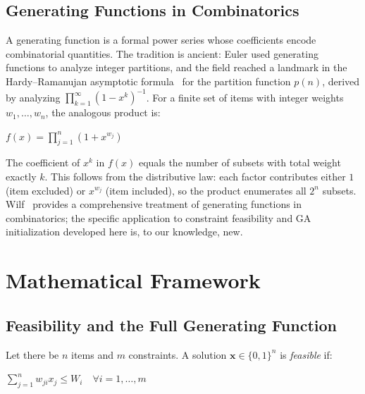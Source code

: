 \documentclass[twocolumn]{article}
\begin{document}
\subsection{Generating Functions in Combinatorics}

A generating function is a formal power series whose coefficients encode 
combinatorial quantities. The tradition is ancient: Euler used generating 
functions to analyze integer partitions, and the field reached a landmark 
in the Hardy--Ramanujan asymptotic formula~\cite{hardyramanujan1918} for 
the partition function $p(n)$, derived by analyzing 
$\prod_{k=1}^{\infty}(1-x^k)^{-1}$. For a finite set of items with 
integer weights $w_1, \ldots, w_n$, the analogous product is:

\begin{flushleft}
\hspace{2em}$f(x) = \prod_{j=1}^{n} (1 + x^{w_j})$
\end{flushleft}

The coefficient of $x^k$ in $f(x)$ equals the number of subsets with 
total weight exactly $k$. This follows from the distributive law: each 
factor contributes either $1$ (item excluded) or $x^{w_j}$ (item included), 
so the product enumerates all $2^n$ subsets. Wilf~\cite{wilf1994genfunc} 
provides a comprehensive treatment of generating functions in combinatorics; 
the specific application to constraint feasibility and GA initialization 
developed here is, to our knowledge, new.

\section{Mathematical Framework}
\label{sec:framework}

\subsection{Feasibility and the Full Generating Function}

Let there be $n$ items and $m$ constraints. A solution 
$\mathbf{x} \in \{0,1\}^n$ is \textit{feasible} if:

\begin{flushleft}
\hspace{2em}$\displaystyle\sum_{j=1}^{n} w_{ji} x_j \leq W_i 
\quad \forall i = 1, \ldots, m$
\end{flushleft}
\end{document}
